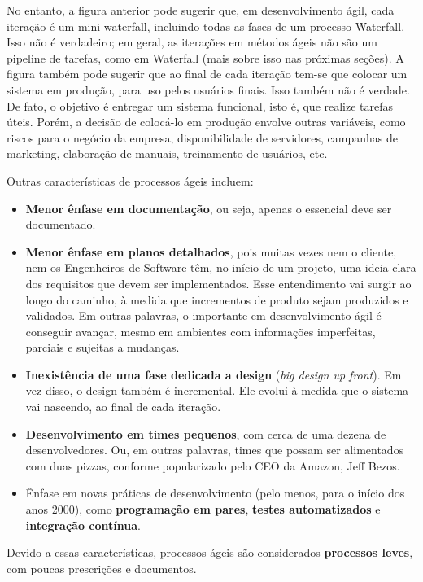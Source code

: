 \documentclass[
  11pt,
  twoside]{book}
\begin{document}
No entanto, a figura anterior pode sugerir que, em desenvolvimento ágil,
cada iteração é um mini-waterfall, incluindo todas as fases de um
processo Waterfall. Isso não é verdadeiro; em geral, as iterações em
métodos ágeis não são um pipeline de tarefas, como em Waterfall (mais
sobre isso nas próximas seções). A figura também pode sugerir que ao
final de cada iteração tem-se que colocar um sistema em produção, para
uso pelos usuários finais. Isso também não é verdade. De fato, o
objetivo é entregar um sistema funcional, isto é, que realize tarefas
úteis. Porém, a decisão de colocá-lo em produção envolve outras
variáveis, como riscos para o negócio da empresa, disponibilidade de
servidores, campanhas de marketing, elaboração de manuais, treinamento
de usuários, etc.

Outras características de processos ágeis incluem:

\begin{itemize}
\item
  \textbf{Menor ênfase em documentação}, ou seja, apenas o essencial
  deve ser documentado.
\item
  \textbf{Menor ênfase em planos detalhados}, pois muitas vezes nem o
  cliente, nem os Engenheiros de Software têm, no início de um projeto,
  uma ideia clara dos requisitos que devem ser implementados. Esse
  entendimento vai surgir ao longo do caminho, à medida que incrementos
  de produto sejam produzidos e validados. Em outras palavras, o
  importante em desenvolvimento ágil é conseguir avançar, mesmo em
  ambientes com informações imperfeitas, parciais e sujeitas a mudanças.
\item
  \textbf{Inexistência de uma fase dedicada a design} (\emph{big design
  up front}). Em vez disso, o design também é incremental. Ele evolui à
  medida que o sistema vai nascendo, ao final de cada iteração.
\item
  \textbf{Desenvolvimento em times pequenos}, com cerca de uma dezena de
  desenvolvedores. Ou, em outras palavras, times que possam ser
  alimentados com duas pizzas, conforme popularizado pelo CEO da Amazon,
  Jeff Bezos.
\item
  Ênfase em novas práticas de desenvolvimento (pelo menos, para o início
  dos anos 2000), como \textbf{programação em pares}, \textbf{testes
  automatizados} e \textbf{integração contínua}.
\end{itemize}

Devido a essas características, processos ágeis são considerados
\textbf{processos leves}, com poucas prescrições e documentos.
\end{document}
